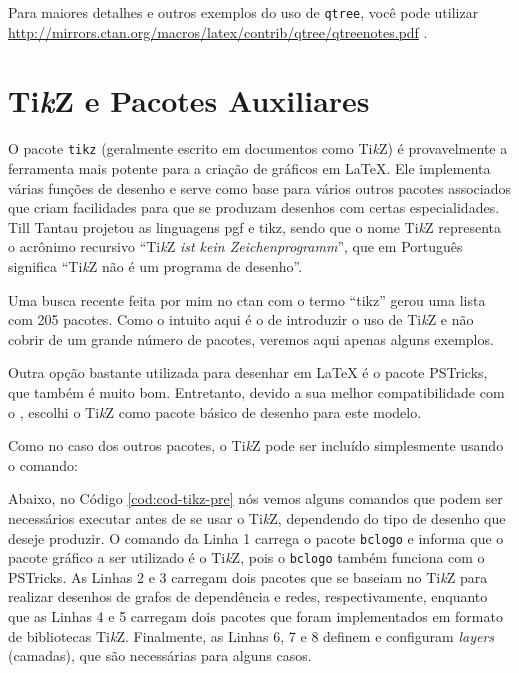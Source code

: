 Para maiores detalhes e outros exemplos do uso de \texttt{qtree}, você pode utilizar \url{http://mirrors.ctan.org/macros/latex/contrib/qtree/qtreenotes.pdf} \parencite{qtree}.

\section{Ti\textit{k}Z e Pacotes Auxiliares} \label{sec:tikz}

O pacote \texttt{tikz} (geralmente escrito em documentos como Ti\textit{k}Z) é provavelmente a ferramenta mais potente para a criação de gráficos em \LaTeX{}. Ele implementa várias funções de desenho e serve como base para vários outros pacotes associados que criam facilidades para que se produzam desenhos com certas especialidades. Till Tantau projetou as linguagens \gls{pgf} e \gls{tikz}, sendo que o nome Ti\textit{k}Z representa o acrônimo recursivo ``Ti\textit{k}Z \textit{ist kein Zeichenprogramm}'', que em Português significa ``Ti\textit{k}Z não é um programa de desenho''.

Uma busca recente feita por mim no \gls{ctan} com o termo ``tikz'' gerou uma lista com 205 pacotes. Como o intuito aqui é o de introduzir o uso de Ti\textit{k}Z e não cobrir de um grande número de pacotes, veremos aqui apenas alguns exemplos.

Outra opção bastante utilizada para desenhar em \LaTeX{} é o pacote PSTricks, que também é muito bom. Entretanto, devido a sua melhor compatibilidade com o , escolhi o Ti\textit{k}Z como pacote básico de desenho para este modelo.

Como no caso dos outros pacotes, o Ti\textit{k}Z pode ser incluído simplesmente usando o comando: 


Abaixo, no Código \ref{cod:cod-tikz-pre} nós vemos alguns comandos que podem ser necessários executar antes de se usar o Ti\textit{k}Z, dependendo do tipo de desenho que deseje produzir. O comando da Linha 1 carrega o pacote \texttt{bclogo} e informa que o pacote gráfico a ser utilizado é o Ti\textit{k}Z, pois o \texttt{bclogo} também funciona com o PSTricks. As Linhas 2 e 3 carregam dois pacotes que se baseiam no Ti\textit{k}Z para realizar desenhos de grafos de dependência e redes, respectivamente, enquanto que as Linhas 4 e 5 carregam dois pacotes que foram implementados em formato de bibliotecas Ti\textit{k}Z. Finalmente, as Linhas 6, 7 e 8 definem e configuram \textit{layers} (camadas), que são necessárias para alguns casos.

